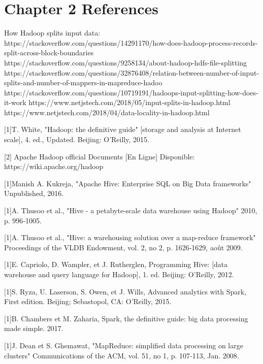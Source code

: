 \documentclass[12pt,english]{book}
\begin{document}
\section{Chapter 2 References}

How Hadoop splits input data:
https://stackoverflow.com/questions/14291170/how-does-hadoop-process-records-split-across-block-boundaries
https://stackoverflow.com/questions/9258134/about-hadoop-hdfs-file-splitting
https://stackoverflow.com/questions/32876408/relation-between-number-of-input-splits-and-number-of-mappers-in-mapreduce-hadoo
https://stackoverflow.com/questions/10719191/hadoops-input-splitting-how-does-it-work
https://www.netjstech.com/2018/05/input-splits-in-hadoop.html
https://www.netjstech.com/2018/04/data-locality-in-hadoop.html		


[1]T. White, "Hadoop: the definitive guide" [storage and analysis at Internet scale], 4. ed., Updated. Beijing: O'Reilly, 2015.

[2] Apache Hadoop official Documents [En Ligne] Disponible: https://wiki.apache.org/hadoop

[1]Manish A. Kukreja, "Apache Hive: Enterprise SQL on Big Data frameworks" Unpublished, 2016.

[1]A. Thusoo et al., "Hive - a petabyte-scale data warehouse using Hadoop" 2010, p. 996‑1005.

[1]A. Thusoo et al., "Hive: a warehousing solution over a map-reduce framework" Proceedings of the VLDB Endowment, vol. 2, no 2, p. 1626‑1629, août 2009.

[1]E. Capriolo, D. Wampler, et J. Rutherglen, Programming Hive: [data warehouse and query language for Hadoop], 1. ed. Beijing: O'Reilly, 2012.

[1]S. Ryza, U. Laserson, S. Owen, et J. Wills, Advanced analytics with Spark, First edition. Beijing; Sebastopol, CA: O'Reilly, 2015.

[1]B. Chambers et M. Zaharia, Spark,  the definitive guide: big data processing made simple. 2017.

[1]J. Dean et S. Ghemawat, "MapReduce: simplified data processing on large clusters" Communications of the ACM, vol. 51, no 1, p. 107‑113, Jan. 2008.
\end{document}
